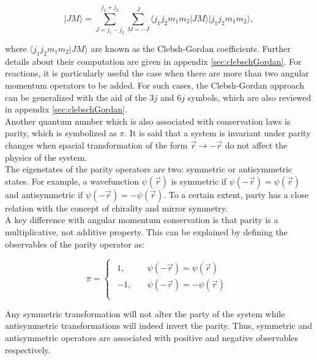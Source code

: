 \documentclass[openany]{book}
\begin{document}
\begin{equation} \label{eq:angularMomentum_coupledBaseExpansion}
 |JM \rangle = \sum_{J = j_1 - j_2}^{j_1 + j_2} \sum_{M = -J}^{J} {\langle j_1j_2m_1m_2 | JM \rangle  |j_1j_2m_1m_2\rangle},
\end{equation}

where $\langle j_1j_2m_1m_2 | JM \rangle $ are known as the Clebsh-Gordan coefficients. Further details about their computation are given in appendix \ref{sec:clebschGordan}. For reactions, it is particularly useful the case when there are more than two angular momentum operators to be added. For such cases, the Clebsh-Gordan approach can be generalized with the aid of the $3j$ and $6j$ symbols, which are also reviewed in appendix \ref{sec:clebschGordan}. \\

Another quantum number which is also associated with conservation laws is parity, which is symbolized as $\pi$. It is said that a system is invariant under parity changes when spacial transformation of the form $\vec r \rightarrow - \vec r$ do not affect the physics of the system. \\

The eigenstates of the parity operators are two: symmetric  or antisymmetric states. For example, a wavefunction $\psi(\vec r)$ is symmetric if $\psi(-\vec r) = \psi(\vec r) $ and antisymmetric if $\psi(-\vec r) = -\psi(\vec r) $. To a certain extent, party has a close relation with the concept of chirality and mirror symmetry. \\

A key difference with angular momentum conservation is that parity is a multiplicative, not additive property. This can be explained by defining the observables of the parity operator as:  

\begin{equation} \label{eq:parity_observables}
	\pi = 	\left\{\begin{array}{l}
		\begin{split}
			1, \quad & \psi(-\vec r) = \psi(\vec r) \\ 
			-1, \quad & \psi(-\vec r) = -\psi(\vec r) \\
		\end{split}
	\end{array}\right.
\end{equation}

Any symmetric transformation will not alter the party of the system while antisymmetric transformations will indeed invert the parity. Thus, symmetric and antisymmetric operators are associated with positive and negative observables respectively.  \\
\end{document}

